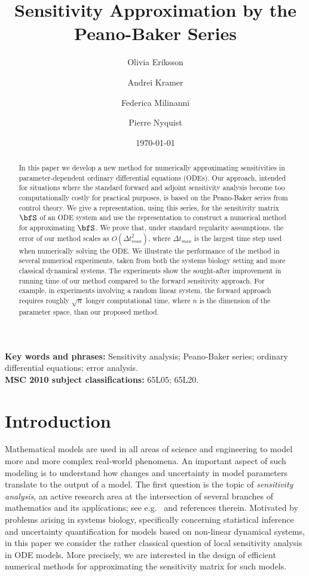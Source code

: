\documentclass[DIV=12]{scrartcl} %
\title{Sensitivity Approximation by the Peano-Baker Series}
\author[2,3]{Olivia Eriksson}
\author[3,4]{Andrei Kramer}
\author[1]{Federica Milinanni}
\author[1]{Pierre Nyquist}
\affil[1]{Department of Mathematics, KTH Royal Institute of Technology, Stockholm, Sweden}
\affil[2]{Electrical Engineering and Computer Science, KTH Royal Institute of Technology, Stockholm, Sweden}
\affil[3]{Science for Life Laboratory, Solna, Sweden}
\affil[4]{Department of Neuroscience, Karolinska Institute, Solna, Sweden}
\date{\today}
\theoremstyle{definition}
\begin{document}
\maketitle
\begin{abstract}
\noindent In this paper we develop a new method for numerically approximating sensitivities in parameter-dependent ordinary differential equations (ODEs). Our approach, intended for situations where the standard forward and adjoint sensitivity analysis become too computationally costly for practical purposes, is based on the Peano-Baker series from control theory. We give a representation, using this series, for the sensitivity matrix $\bfS$ of an ODE system and use the representation to construct a numerical method for approximating $\bfS$. We prove that, under standard regularity assumptions, the error of our method scales as $O(\Delta t ^2 _{max})$, where $\Delta t _{max}$ is the largest time step used when numerically solving the ODE. We illustrate the performance of the method in several numerical experiments, taken from both the systems biology setting and more classical dynamical systems. The experiments show the sought-after improvement in running time of our method compared to the forward sensitivity approach. For example, in experiments involving a random linear system, the forward approach requires roughly $\sqrt{n}$ longer computational time, where $n$ is the dimension of the parameter space, than our proposed method.

\end{abstract}

\noindent \textbf{Key words and phrases:} Sensitivity analysis; Peano-Baker series; ordinary differential equations; error analysis.\\

\noindent \textbf{MSC 2010 subject classifications:} 65L05; 65L20.

\section{Introduction}
\label{sec:intro}



Mathematical models are used in all areas of science and engineering to model more and more complex real-world phenomena. An important aspect of such modeling is to understand how changes and uncertainty in model parameters translate to the output of a model. The first question is the topic of \textit{sensitivity analysis}, an active research area at the intersection of several branches of mathematics and its applications; see e.g.\ \cite{Frank78, CS85, Cacuci03, STCR04, CIBN05} and references therein. Motivated by problems arising in systems biology, specifically concerning statistical inference and uncertainty quantification for models based on non-linear dynamical systems, in this paper we consider the rather classical question of local sensitivity analysis in ODE models. More precisely, we are interested in the design of efficient numerical methods for approximating the sensitivity matrix for such models.
\end{document}
